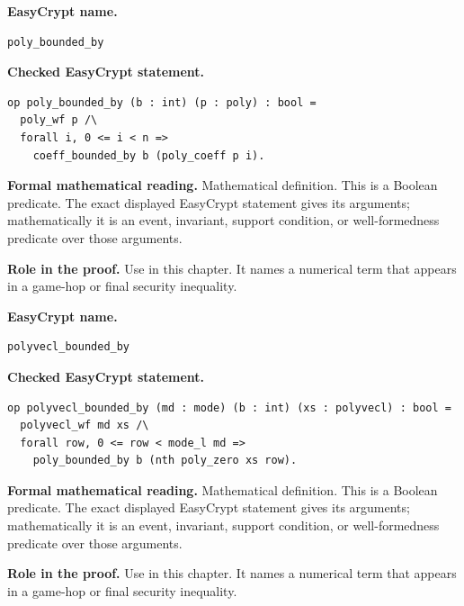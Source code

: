 \begin{formaldefinition}
\noindent\textbf{EasyCrypt name.}
\begin{lstlisting}[language=EasyCrypt,basicstyle=\ttfamily\scriptsize]
poly_bounded_by
\end{lstlisting}
\noindent\textbf{Checked EasyCrypt statement.}
\begin{lstlisting}[language=EasyCrypt,basicstyle=\ttfamily\scriptsize]
op poly_bounded_by (b : int) (p : poly) : bool =
  poly_wf p /\
  forall i, 0 <= i < n =>
    coeff_bounded_by b (poly_coeff p i).
\end{lstlisting}
\noindent\textbf{Formal mathematical reading.}
Mathematical definition. This is a Boolean predicate.  The exact displayed EasyCrypt statement gives its arguments; mathematically it is an event, invariant, support condition, or well-formedness predicate over those arguments.

\noindent\textbf{Role in the proof.}
Use in this chapter. It names a numerical term that appears in a game-hop or final security inequality.

\end{formaldefinition}

\begin{formaldefinition}
\noindent\textbf{EasyCrypt name.}
\begin{lstlisting}[language=EasyCrypt,basicstyle=\ttfamily\scriptsize]
polyvecl_bounded_by
\end{lstlisting}
\noindent\textbf{Checked EasyCrypt statement.}
\begin{lstlisting}[language=EasyCrypt,basicstyle=\ttfamily\scriptsize]
op polyvecl_bounded_by (md : mode) (b : int) (xs : polyvecl) : bool =
  polyvecl_wf md xs /\
  forall row, 0 <= row < mode_l md =>
    poly_bounded_by b (nth poly_zero xs row).
\end{lstlisting}
\noindent\textbf{Formal mathematical reading.}
Mathematical definition. This is a Boolean predicate.  The exact displayed EasyCrypt statement gives its arguments; mathematically it is an event, invariant, support condition, or well-formedness predicate over those arguments.

\noindent\textbf{Role in the proof.}
Use in this chapter. It names a numerical term that appears in a game-hop or final security inequality.

\end{formaldefinition}

